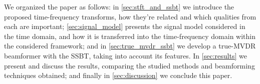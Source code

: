 We organized the paper as follows:%
in \cref{sec:stft_and_ssbt} we introduce the proposed time-frequency transforms, how they're related and which qualities from each are important;%
\cref{sec:signal_model} presents the signal model considered in the time domain, and how it is transferred into the time-frequency domain within the considered framework;
and in \cref{sec:true_mvdr_ssbt} we develop a true-MVDR beamformer with the SSBT, taking into account its features. In \cref{sec:results} we present and discuss the results, comparing the studied methods and beamforming techniques obtained; and finally in \cref{sec:discussion} we conclude this paper.
%
